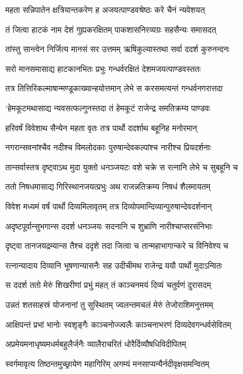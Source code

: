 \twolineshloka
{महता सन्निपातेन क्षत्रियान्तकरेण ह}
{अजयत्पाण्डवश्रेष्ठः करे चैनं न्यवेशयत्}


\twolineshloka
{तं जित्वा हाटकं नाम देशं गुह्यकरक्षितम्}
{पाकशासनिरव्यग्रः सहसैन्यः समासदत्}


\twolineshloka
{तांस्तु सान्त्वेन निर्जित्य मानसं सर उत्तमम्}
{ऋषिकुल्यास्तथा सर्वा ददर्श कुरुनन्दनः}


\twolineshloka
{सरो मानसमासाद्य हाटकानभितः प्रभुः}
{गन्धर्वरक्षितं देशमजयत्पाण्डवस्ततः}


\twolineshloka
{तत्र तित्तिरिकल्माषान्मण्डूकाख्यान्हयोत्तमान्}
{लेभे स करसमत्यन्तं गन्धर्वनगरात्तदा}


\twolineshloka
{`हेमकूटमथासाद्य न्यवसत्फल्गुनस्तदा}
{तं हेमकूटं राजेन्द्र समतिक्रम्य पाण्डवः}


\twolineshloka
{हरिवर्षं विवेशाथ सैन्येन महता वृतः}
{तत्र पार्थो ददर्शाथ बहूनिह मनोरमान्}


\twolineshloka
{नगरान्सवनांश्चैव नदीश्च विमलोदकाः}
{पुरुषान्देवकल्पांश्च नारीश्च प्रियदर्शनाः}


\twolineshloka
{तान्सर्वास्तत्र दृष्ट्वाऽथ मुदा युक्तो धनञ्जयटः}
{वशे चक्रे स रत्नानि लेभे च सुबहूनि च}


\twolineshloka
{ततो निषधमासाद्य गिरिस्थानजयत्प्रभुः}
{अथ राजन्नतिक्रम्य निषधं शैलमायतम्}


\twolineshloka
{विवेश मध्यमं वर्षं पार्थो दिव्यमिलावृतम्}
{तत्र दिव्योपमान्दिव्यान्पुरुषान्देवदर्शनान्}


\twolineshloka
{अदृष्टपूर्वान्सुभगान्स ददर्श धनञ्जयः}
{सदनानि च शुभ्राणि नारीश्चाप्सरसंनिभाः}


\twolineshloka
{दृष्ट्वा तानजयद्रम्यान्स तैश्च ददृशे तदा}
{जित्वा च तान्महाभागान्करे च विनिवेश्य च}


\twolineshloka
{रत्नान्यादाय दिव्यानि भूषणान्यासनैः सह}
{उदीचीमथ राजेन्द्र ययौ पार्थो मुदाऽन्वितः}


\twolineshloka
{स ददर्श ततो मेरुं शिखरीणां प्रभुं महत्}
{तं काञ्चनमयं दिव्यं चतुर्वणं दुरासदम्}


\twolineshloka
{उन्नतं शतसाहस्रं योजनानां तु सुस्थितम्}
{ज्वलन्तमचलं मेरुं तेजोराशिमनुत्तमम्}


\twolineshloka
{आक्षिपन्तं प्रभां भानोः स्वशृङ्गैः काञ्चनोज्ज्वलैः}
{काञ्चनाभरणं दिव्यदेवगन्धर्वसेवितम्}


\twolineshloka
{अप्रमेयमनाधृष्यमधर्मबहुलैर्जनैः}
{व्यालैराचरितं धोरैर्दिव्यौषधिविदीपितम्}


\twolineshloka
{स्वर्गमावृत्य तिष्ठन्तमुच्छ्रायेण महागिरिम्}
{अगम्यं मनसाप्यन्यैर्नदीवृक्षसमन्वितम्}


